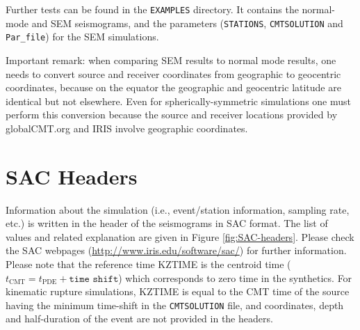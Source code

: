 \documentclass[oneside,english]{book}
\newcommand{\urlwithparentheses}[1]{(\url{#1})}
\begin{document}
Further tests can be found in the \texttt{EXAMPLES} directory. It
contains the normal-mode and SEM seismograms, and the parameters (\texttt{STATIONS},
\texttt{CMTSOLUTION} and \texttt{Par\_file}) for the SEM simulations.

Important remark: when comparing SEM results to normal mode results, one needs to
convert source and receiver coordinates from geographic to geocentric coordinates,
because on the equator the geographic and
geocentric latitude are identical but not elsewhere. Even for
spherically-symmetric simulations one must perform this conversion
because the source and receiver locations provided by globalCMT.org and
IRIS involve geographic coordinates.

\chapter{\label{cha:SAC-headers}SAC Headers}

Information about the simulation (i.e., event/station information, sampling rate, etc.)
is written in the header of the seismograms in SAC format.
The list of values and related explanation are given in Figure \ref{fig:SAC-headers}.
Please check the SAC webpages \urlwithparentheses{http://www.iris.edu/software/sac/} for further information.
Please note that the reference time KZTIME is the centroid time ($t_\text{CMT}=t_\text{PDE}+\texttt{time shift}$)
which corresponds to zero time in the synthetics.
For kinematic rupture simulations, KZTIME is equal to the CMT time of the source having the minimum time-shift
in the \texttt{CMTSOLUTION} file, and coordinates, depth and half-duration of the event are not provided in the headers.
\end{document}
